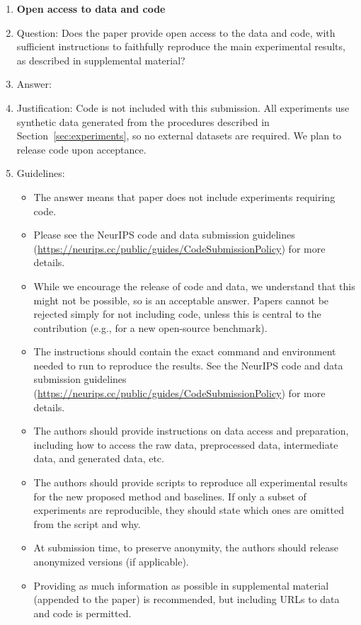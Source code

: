 \documentclass{article}
\begin{document}
\begin{enumerate}
\item {\bf Open access to data and code}
    \item[] Question: Does the paper provide open access to the data and code, with sufficient instructions to faithfully reproduce the main experimental results, as described in supplemental material?
    \item[] Answer: \answerNo{}
    \item[] Justification: Code is not included with this submission. All experiments use synthetic data generated from the procedures described in Section~\ref{sec:experiments}, so no external datasets are required. We plan to release code upon acceptance.
    \item[] Guidelines:
    \begin{itemize}
        \item The answer \answerNA{} means that paper does not include experiments requiring code.
        \item Please see the NeurIPS code and data submission guidelines (\url{https://neurips.cc/public/guides/CodeSubmissionPolicy}) for more details.
        \item While we encourage the release of code and data, we understand that this might not be possible, so \answerNo{} is an acceptable answer. Papers cannot be rejected simply for not including code, unless this is central to the contribution (e.g., for a new open-source benchmark).
        \item The instructions should contain the exact command and environment needed to run to reproduce the results. See the NeurIPS code and data submission guidelines (\url{https://neurips.cc/public/guides/CodeSubmissionPolicy}) for more details.
        \item The authors should provide instructions on data access and preparation, including how to access the raw data, preprocessed data, intermediate data, and generated data, etc.
        \item The authors should provide scripts to reproduce all experimental results for the new proposed method and baselines. If only a subset of experiments are reproducible, they should state which ones are omitted from the script and why.
        \item At submission time, to preserve anonymity, the authors should release anonymized versions (if applicable).
        \item Providing as much information as possible in supplemental material (appended to the paper) is recommended, but including URLs to data and code is permitted.
    \end{itemize}



\end{enumerate}
\end{document}
